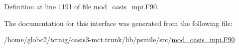 Definition at line 1191 of file mod\+\_\+oasis\+\_\+mpi.\+F90.



The documentation for this interface was generated from the following file\+:\begin{DoxyCompactItemize}
\item 
/home/globc2/tcraig/oasis3-\/mct.\+trunk/lib/psmile/src/\hyperlink{mod__oasis__mpi_8_f90}{mod\+\_\+oasis\+\_\+mpi.\+F90}\end{DoxyCompactItemize}

